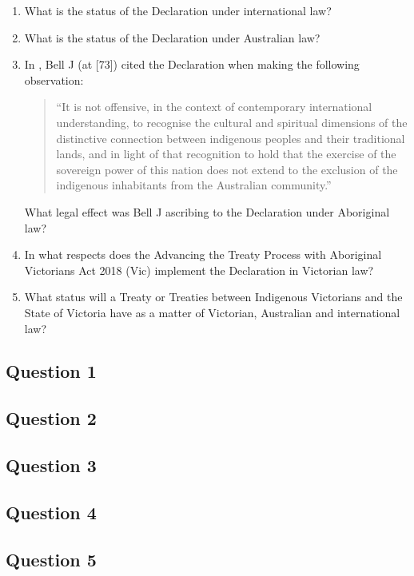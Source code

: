 \begin{tutorialquestion}
    \begin{enumerate}
        \item What is the status of the Declaration under international law?
        \item What is the status of the Declaration under Australian law?
        \item In , Bell J (at [73]) cited the Declaration when making the following observation:
        \begin{quote}
            ``It is not offensive, in the context of contemporary international understanding, to recognise the cultural and spiritual dimensions of the distinctive connection between indigenous peoples and their traditional lands, and in light of that recognition to hold that the exercise of the sovereign power of this nation does not extend to the exclusion of the indigenous inhabitants from the Australian community.''
        \end{quote}

        What legal effect was Bell J ascribing to the Declaration under Aboriginal law?
        \item In what respects does the Advancing the Treaty Process with Aboriginal Victorians Act 2018 (Vic) implement the Declaration in Victorian law?
        \item What status will a Treaty or Treaties between Indigenous Victorians and the State of Victoria have as a matter of Victorian, Australian and international law?
    \end{enumerate}
\end{tutorialquestion}

\subsection*{Question 1}
\subsection*{Question 2}
\subsection*{Question 3}
\subsection*{Question 4}
\subsection*{Question 5}